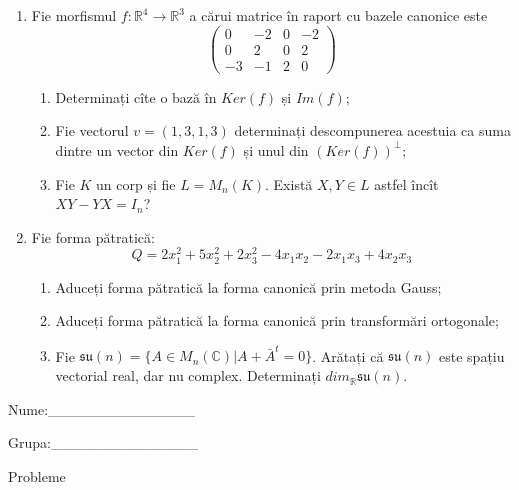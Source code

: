 \documentclass{article}
\begin{document}
\begin{enumerate}
 \item Fie morfismul $f:\mathbb{R}^4 \to \mathbb{R}^3$ a cărui matrice în raport cu bazele canonice este
$$\begin{pmatrix}
0&-2&0&-2\\
0&2&0&2\\
-3&-1&2&0
\end{pmatrix}$$

\begin{enumerate}
\item Determinați cîte o bază în $Ker(f)$ și $Im(f)$;
\item Fie vectorul $v=(1,3,1,3)$ determinați descompunerea acestuia ca suma dintre un vector din $Ker(f)$ și unul din $(Ker(f))^\perp$;
\item Fie $K$ un corp și fie $L=M_n(K)$. Există $X,Y \in L$ astfel încît $XY-YX=I_n$?  
\end{enumerate}
\item Fie forma pătratică:
$$Q= 2x_1^2+5x_2^2+2x_3^2-4x_1x_2-2x_1x_3+4x_2x_3$$

\begin{enumerate}
\item Aduceți forma pătratică la forma canonică prin metoda Gauss;
\item Aduceți forma pătratică la forma canonică prin transformări ortogonale;
\item Fie $\mathfrak{su}(n)=\{ A \in M_n(\mathbb{C}) | A+\bar{A}^t=0\}$. Arătați că $\mathfrak{su}(n)$ este spațiu vectorial real, dar nu complex.
Determinați $dim_{\mathbb{R}}\mathfrak{su}(n)$.
\end{enumerate}
\end{enumerate}
\newpage
\begin{flushright}
Nume:\_\_\_\_\_\_\_\_\_\_\_\_\_\_
 
 
Grupa:\_\_\_\_\_\_\_\_\_\_\_\_\_\_
\end{flushright}
\begin{center}
\vspace{2cm}
{\Large Probleme}
\vspace{2cm}
\end{center}
\end{document}
